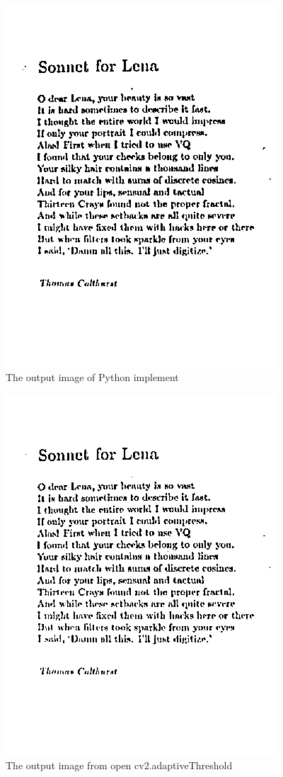 \documentclass[12pt]{article}
\begin{document}
\begin{enumerate}[leftmargin=\labelsep]
\begin{enumerate}
\begin{figure}[H]
        \centering
        \includegraphics[]{Figure/output.png}
        \caption{The output image of Python implement}
        \label{Q3_1}
\end{figure}

\begin{figure}[H]
        \centering
        \includegraphics[]{Figure/cv2_output.png}
        \caption{The output image from open cv2.adaptiveThreshold}
        \label{Q3_2}
\end{figure}


\end{enumerate}
\end{enumerate}
\end{document}
